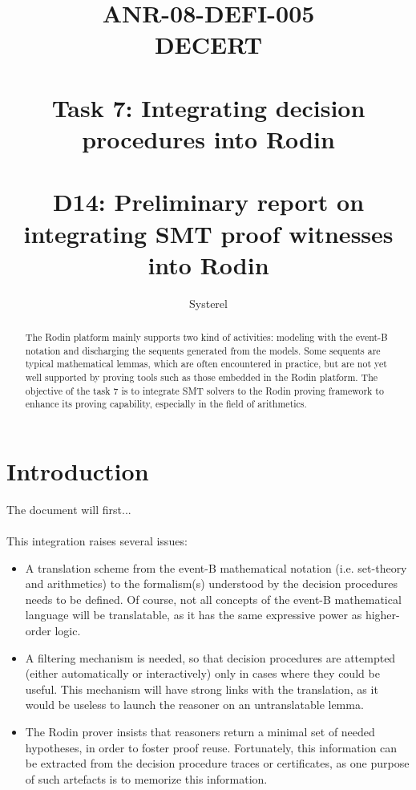 \documentclass[10pt,a4paper]{report}
\title{ANR-08-DEFI-005 \\ DECERT \\ ~ \\ Task 7: Integrating decision procedures into Rodin \\ ~ \\ D14: Preliminary report on integrating SMT proof witnesses into Rodin}
\author{Systerel}
\begin{document}
\maketitle

\begin{abstract}

The Rodin platform \cite{RODIN} mainly supports two kind of activities: modeling with the event-B notation and discharging the sequents generated from the models. 
Some sequents are typical mathematical lemmas, which are often encountered in practice, but are not yet well supported by proving tools such as those embedded in the Rodin platform.
The objective of the task 7 is to integrate SMT solvers to the Rodin proving framework to enhance its proving capability, especially in the field of arithmetics.

\end{abstract}

\tableofcontents

\section{Introduction}
The document will first...

\paragraph{}
This integration raises several issues:
\begin{itemize}
\item A translation scheme from the event-B mathematical notation (i.e. set-theory and arithmetics) to the formalism(s) understood by the decision procedures needs to be defined. Of course, not all
concepts of the event-B mathematical language will be translatable, as it has the same expressive
power as higher-order logic.
\item A filtering mechanism is needed, so that decision procedures are attempted (either automatically or interactively) only in cases where they could be useful. This mechanism will have strong links with the translation, as it would be useless to launch the reasoner on an untranslatable lemma.
\item The Rodin prover insists that reasoners return a minimal set of needed hypotheses, in order to foster proof reuse. Fortunately, this information can be extracted from the decision procedure
traces or certificates, as one purpose of such artefacts is to memorize this information.
\end{itemize}
\end{document}
